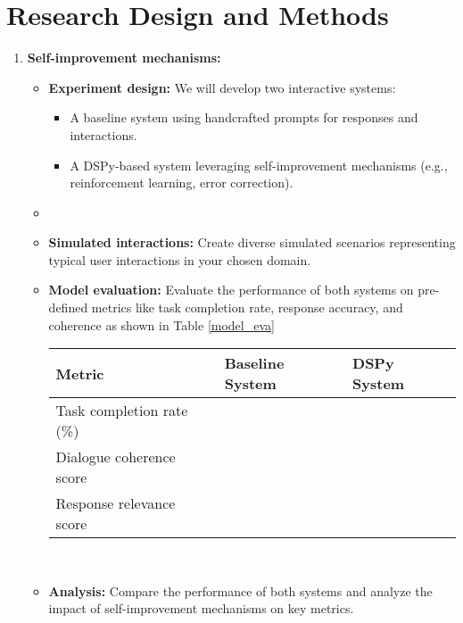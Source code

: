 \section{Research Design and Methods}
\begin{enumerate}
    \item \textbf{Self-improvement mechanisms:}
        \begin{itemize}
            \item \textbf{Experiment design:} We will develop two interactive systems:
                \begin{itemize}
                    \item A baseline system using handcrafted prompts for responses and interactions.
                    \item A DSPy-based system leveraging self-improvement mechanisms (e.g., reinforcement learning, error correction).
                \end{itemize}
            \item 

            \item \textbf{Simulated interactions:} Create diverse simulated scenarios representing typical user interactions in your chosen domain.
            
            \item \textbf{Model evaluation:} Evaluate the performance of both systems on pre-defined metrics like task completion rate, response accuracy, and coherence as shown in Table \ref{model_eva}

            \begin{center}
                \label{model_eva}
                \begin{tabular}{ |p{5cm}|p{2.5cm}|p{2.5cm}|  }
                \hline \textbf{Metric} & \textbf{Baseline System} & \textbf{DSPy System}\\
                \hline
                Task completion rate (\%)&&\\
                \hline
                Dialogue coherence score&&\\
                \hline
                Response relevance score&&\\
                 \hline
                \end{tabular}
            \end{center}
            \\
            \item \textbf{Analysis:} Compare the performance of both systems and analyze the impact of self-improvement mechanisms on key metrics.


\end{itemize}
\end{enumerate}
